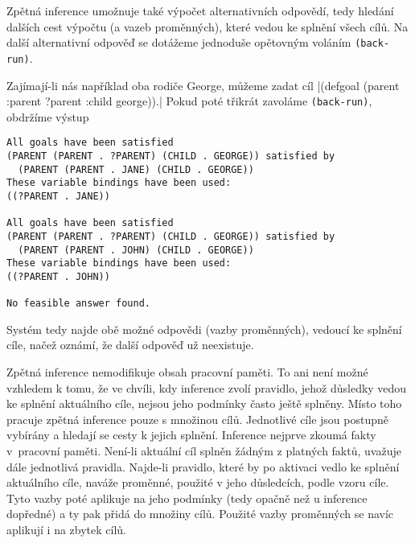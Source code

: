 Zpětná inference umožnuje také výpočet alternativních odpovědí, tedy hledání dalších
cest výpočtu (a vazeb proměnných), které vedou ke splnění všech cílů. Na další
alternativní odpověď se dotážeme jednoduše opětovným voláním \verb|(back-run)|.

Zajímají-li nás například oba rodiče George, můžeme zadat cíl
\cl|(defgoal (parent :parent ?parent :child george)).|
Pokud poté třikrát zavoláme \verb|(back-run)|, obdržíme výstup
\begin{verbatim}
All goals have been satisfied
(PARENT (PARENT . ?PARENT) (CHILD . GEORGE)) satisfied by
  (PARENT (PARENT . JANE) (CHILD . GEORGE))
These variable bindings have been used:
((?PARENT . JANE))

All goals have been satisfied
(PARENT (PARENT . ?PARENT) (CHILD . GEORGE)) satisfied by
  (PARENT (PARENT . JOHN) (CHILD . GEORGE))
These variable bindings have been used:
((?PARENT . JOHN))

No feasible answer found.
\end{verbatim}
Systém tedy najde obě možné odpovědi (vazby proměnných), vedoucí ke splnění
cíle, načež oznámí, že další odpověď už neexistuje.

Zpětná inference nemodifikuje obsah pracovní paměti. To ani není možné vzhledem
k tomu, že ve chvíli, kdy inference zvolí pravidlo, jehož důsledky vedou ke
splnění aktuálního cíle, nejsou jeho podmínky často ještě splněny. Místo toho
pracuje zpětná inference pouze s množinou cílů. Jednotlivé cíle jsou postupně
vybírány a hledají se cesty k jejich splnění. Inference nejprve zkoumá fakty
v~pracovní paměti. Není-li aktuální cíl splněn žádným z platných faktů, uvažuje
dále jednotlivá pravidla. Najde-li pravidlo, které by po aktivaci vedlo ke
splnění aktuálního cíle, naváže proměnné, použité v jeho důsledcích, podle vzoru
cíle. Tyto vazby poté aplikuje na jeho podmínky (tedy opačně než u inference
dopředné) a ty pak přidá do množiny cílů. Použité vazby proměnných se navíc
aplikují i na zbytek cílů.

